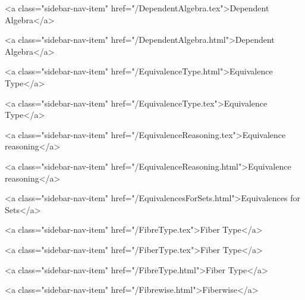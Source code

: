       
    
      
        
          <a class="sidebar-nav-item" href="/DependentAlgebra.tex">Dependent Algebra</a>
        
      
    
      
        
          <a class="sidebar-nav-item" href="/DependentAlgebra.html">Dependent Algebra</a>
        
      
    
      
        
          <a class="sidebar-nav-item" href="/EquivalenceType.html">Equivalence Type</a>
        
      
    
      
        
          <a class="sidebar-nav-item" href="/EquivalenceType.tex">Equivalence Type</a>
        
      
    
      
        
          <a class="sidebar-nav-item" href="/EquivalenceReasoning.tex">Equivalence reasoning</a>
        
      
    
      
        
          <a class="sidebar-nav-item" href="/EquivalenceReasoning.html">Equivalence reasoning</a>
        
      
    
      
        
          <a class="sidebar-nav-item" href="/EquivalencesForSets.html">Equivalences for Sets</a>
        
      
    
      
        
          <a class="sidebar-nav-item" href="/FibreType.tex">Fiber Type</a>
        
      
    
      
        
          <a class="sidebar-nav-item" href="/FiberType.tex">Fiber Type</a>
        
      
    
      
        
          <a class="sidebar-nav-item" href="/FibreType.html">Fiber Type</a>
        
      
    
      
        
          <a class="sidebar-nav-item" href="/Fibrewise.html">Fiberwise</a>
        
